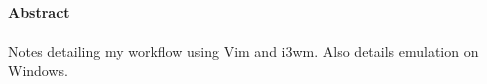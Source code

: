 \documentclass[twoside,10pt]{book}
\numberwithin{equation}{chapter} %
\numberwithin{figure}{chapter}
\begin{document}
	\setcounter{page}{1}
	

	\newpage\null\thispagestyle{empty}\newpage
	\paragraph{ \vspace{3.5cm}}\begin{center}\end{center}



\noindent \textbf{ {\Large Abstract}}

\paragraph{}
Notes detailing my workflow using Vim and i3wm. Also details emulation on
Windows.


\newpage
\paragraph{ \vspace{3.5cm}}\begin{center}\end{center}

\tableofcontents






\cleardoublepage {}

\nocite{*}
{}

\end{document}
